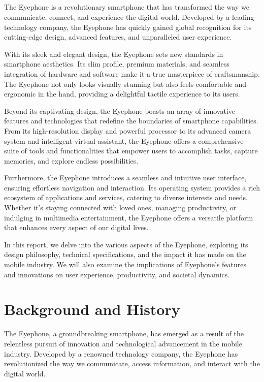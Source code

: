 \documentclass[a4paper,11pt]{report}
\begin{document}
\paragraph{}
The Eyephone is a revolutionary smartphone that has transformed the way we communicate, connect, and experience the digital world. Developed by a leading technology company, the Eyephone has quickly gained global recognition for its cutting-edge design, advanced features, and unparalleled user experience.

With its sleek and elegant design, the Eyephone sets new standards in smartphone aesthetics. Its slim profile, premium materials, and seamless integration of hardware and software make it a true masterpiece of craftsmanship. The Eyephone not only looks visually stunning but also feels comfortable and ergonomic in the hand, providing a delightful tactile experience to its users.

Beyond its captivating design, the Eyephone boasts an array of innovative features and technologies that redefine the boundaries of smartphone capabilities. From its high-resolution display and powerful processor to its advanced camera system and intelligent virtual assistant, the Eyephone offers a comprehensive suite of tools and functionalities that empower users to accomplish tasks, capture memories, and explore endless possibilities.

Furthermore, the Eyephone introduces a seamless and intuitive user interface, ensuring effortless navigation and interaction. Its operating system provides a rich ecosystem of applications and services, catering to diverse interests and needs. Whether it's staying connected with loved ones, managing productivity, or indulging in multimedia entertainment, the Eyephone offers a versatile platform that enhances every aspect of our digital lives.

In this report, we delve into the various aspects of the Eyephone, exploring its design philosophy, technical specifications, and the impact it has made on the mobile industry. We will also examine the implications of Eyephone's features and innovations on user experience, productivity, and societal dynamics.
  
\chapter{Background and History}
The Eyephone, a groundbreaking smartphone, has emerged as a result of the relentless pursuit of innovation and technological advancement in the mobile industry. Developed by a renowned technology company, the Eyephone has revolutionized the way we communicate, access information, and interact with the digital world.
\end{document}
